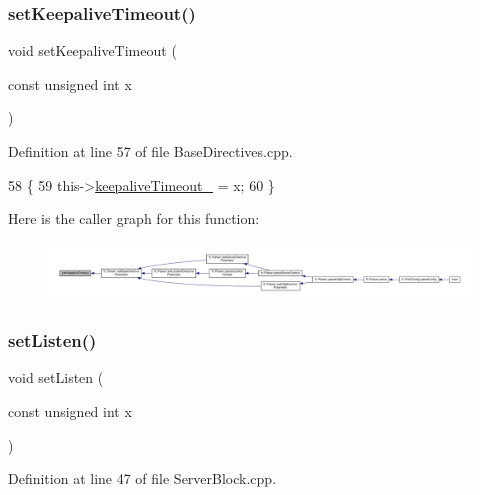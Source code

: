 \subsubsection{\texorpdfstring{set\+Keepalive\+Timeout()}{setKeepaliveTimeout()}}
{\footnotesize\ttfamily void set\+Keepalive\+Timeout (\begin{DoxyParamCaption}\item[{const unsigned int}]{x }\end{DoxyParamCaption})\hspace{0.3cm}{\ttfamily [inherited]}}



Definition at line 57 of file Base\+Directives.\+cpp.


\begin{DoxyCode}
58     \{
59         this->\hyperlink{classft_1_1_base_directives_aa1f5f394b428d0d18765a9b9e14e648f}{keepaliveTimeout\_} = x;
60     \}
\end{DoxyCode}
Here is the caller graph for this function\+:
\nopagebreak
\begin{figure}[H]
\begin{center}
\leavevmode
\includegraphics[width=350pt]{classft_1_1_base_directives_a0818b8529872ba9622329e2118d20c39_icgraph}
\end{center}
\end{figure}
\mbox{\label{classft_1_1_server_block_a6ada7f58bd6d345178035030f68d15d1}} 
\subsubsection{\texorpdfstring{set\+Listen()}{setListen()}}
{\footnotesize\ttfamily void set\+Listen (\begin{DoxyParamCaption}\item[{const unsigned int}]{x }\end{DoxyParamCaption})}



Definition at line 47 of file Server\+Block.\+cpp.


